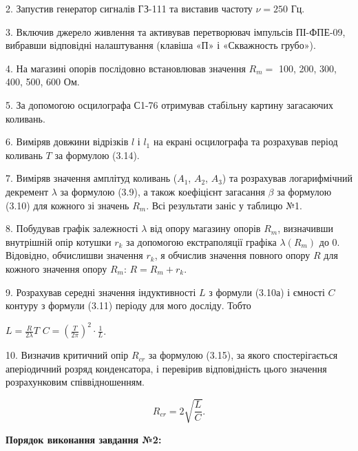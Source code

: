 \documentclass[12pt,a4paper]{article}
\begin{document}
    2. Запустив генератор сигналів ГЗ-111 та виставив частоту $\nu = 250$ Гц.

    3. Включив джерело живлення та активував перетворювач імпульсів ПІ-ФПЕ-09, вибравши відповідні налаштування (клавіша «П» і «Скважность грубо»).

    4. На магазині опорів послідовно встановлював значення $R_m = $ 100, 200, 300, 400, 500, 600 Ом.

    5. За допомогою осцилографа С1-76 отримував стабільну картину загасаючих коливань.

    6. Виміряв довжини відрізків $l$ і $l_1$ на екрані осцилографа та розрахував період коливань $T$ за формулою (3.14).

    7. Виміряв значення амплітуд коливань ($A_1$, $A_2$, $A_3$) та розрахував логарифмічний декремент $\lambda$ за формулою (3.9), а також коефіцієнт загасання $\beta$ за формулою (3.10) для кожного зі значень $R_m$. Всі результати заніс у таблицю №1.

    8. Побудував графік залежності $\lambda$ від опору магазину опорів $R_m$, визначивши внутрішній опір котушки $r_k$ за допомогою екстраполяції графіка $\lambda(R_m)$ до 0. Відовідно, обчислишви значення $r_k$, я обчислив значення повного
    опору $R$ для кожного значення опору $R_m$: $R = R_m + r_k$.

    9. Розрахував середні значення індуктивності $L$ з формули (3.10а) і ємності $C$ контуру з формули (3.11) періоду для мого досліду. Тобто

    \begin{center}
        $\displaystyle L = \frac{R}{2\lambda} T$  $\displaystyle C = \left( \frac{T}{2\pi} \right)^2 \cdot \frac{1}{L}$.
    \end{center}

    10. Визначив критичний опір $R_{cr}$ за формулою (3.15), за якого спостерігається аперіодичний розряд конденсатора, і перевірив відповідність цього значення розрахунковим співвідношенням.

    \begin{equation}
        R_{cr} = 2 \sqrt{\frac{L}{C}}.
        \tag{3.15}
    \end{equation}

    \vspace{1em} %

    \setlength{\parindent}{0pt}

    \textbf{Порядок виконання завдання №2:}

    \vspace{1em} %
\end{document}
